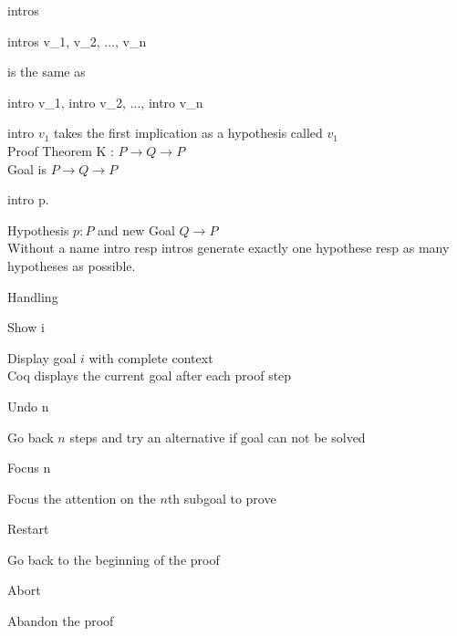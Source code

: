 \begin{frame}[fragile]{intros}
	\begin{user}
		intros v_1, v_2, ..., v_n
	\end{user}
	is the same as
	\begin{user}
		intro v_1, intro v_2, ..., intro v_n
	\end{user}
	\pause
	intro $v_1$ takes the first implication as a hypothesis called $v_1$\\
	\medskip
	\pause
	Proof Theorem K : $P \rightarrow Q \rightarrow P$\\
	\pause
	Goal is  $P \rightarrow Q \rightarrow P$\\
	\pause
	\begin{user}
		intro p.
	\end{user}
	Hypothesis $p:P$ and new Goal $Q \rightarrow P$\\
	\pause
	\bigskip
	Without a name intro resp intros generate exactly one hypothese resp as many hypotheses as possible.
\end{frame}
\begin{frame}[fragile]{Handling}
	\begin{user}
		Show i
	\end{user}
	Display goal $i$ with complete context\\
	Coq displays the current goal after each proof step
	\pause
	\medskip
	\begin{user}
		Undo n
	\end{user}
	Go back $n$ steps and try an alternative if goal can not be solved
	\pause
	\medskip
	\begin{user}
		Focus n
	\end{user}
	Focus the attention on the $n$th subgoal to prove
	\pause
	\medskip
	\begin{user}
		Restart
	\end{user}
	Go back to the beginning of the proof
	\pause
	\medskip
	\begin{user}
		Abort
	\end{user}
	Abandon the proof
\end{frame}

